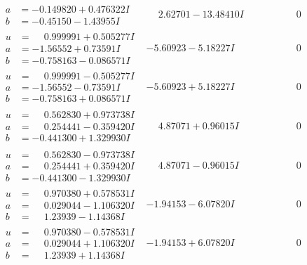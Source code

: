 \documentclass[1p]{elsarticle_modified}
\theoremstyle{definition}
\begin{document}
$$\begin{array}{c|c|c}
\begin{aligned}
a &= -0.149820 + 0.476322 I \\
b &= -0.45150 - 1.43955 I\end{aligned}
 & \phantom{-}2.62701 - 13.48410 I & \phantom{-0.000000 } 0 \\ \hline\begin{aligned}
u &= \phantom{-}0.999991 + 0.505277 I \\
a &= -1.56552 + 0.73591 I \\
b &= -0.758163 - 0.086571 I\end{aligned}
 & -5.60923 - 5.18227 I & \phantom{-0.000000 } 0 \\ \hline\begin{aligned}
u &= \phantom{-}0.999991 - 0.505277 I \\
a &= -1.56552 - 0.73591 I \\
b &= -0.758163 + 0.086571 I\end{aligned}
 & -5.60923 + 5.18227 I & \phantom{-0.000000 } 0 \\ \hline\begin{aligned}
u &= \phantom{-}0.562830 + 0.973738 I \\
a &= \phantom{-}0.254441 - 0.359420 I \\
b &= -0.441300 + 1.329930 I\end{aligned}
 & \phantom{-}4.87071 + 0.96015 I & \phantom{-0.000000 } 0 \\ \hline\begin{aligned}
u &= \phantom{-}0.562830 - 0.973738 I \\
a &= \phantom{-}0.254441 + 0.359420 I \\
b &= -0.441300 - 1.329930 I\end{aligned}
 & \phantom{-}4.87071 - 0.96015 I & \phantom{-0.000000 } 0 \\ \hline\begin{aligned}
u &= \phantom{-}0.970380 + 0.578531 I \\
a &= \phantom{-}0.029044 - 1.106320 I \\
b &= \phantom{-}1.23939 - 1.14368 I\end{aligned}
 & -1.94153 - 6.07820 I & \phantom{-0.000000 } 0 \\ \hline\begin{aligned}
u &= \phantom{-}0.970380 - 0.578531 I \\
a &= \phantom{-}0.029044 + 1.106320 I \\
b &= \phantom{-}1.23939 + 1.14368 I\end{aligned}
 & -1.94153 + 6.07820 I & \phantom{-0.000000 } 0 \\ \hline\begin{aligned}

\end{aligned}
\end{array}$$
\end{document}

